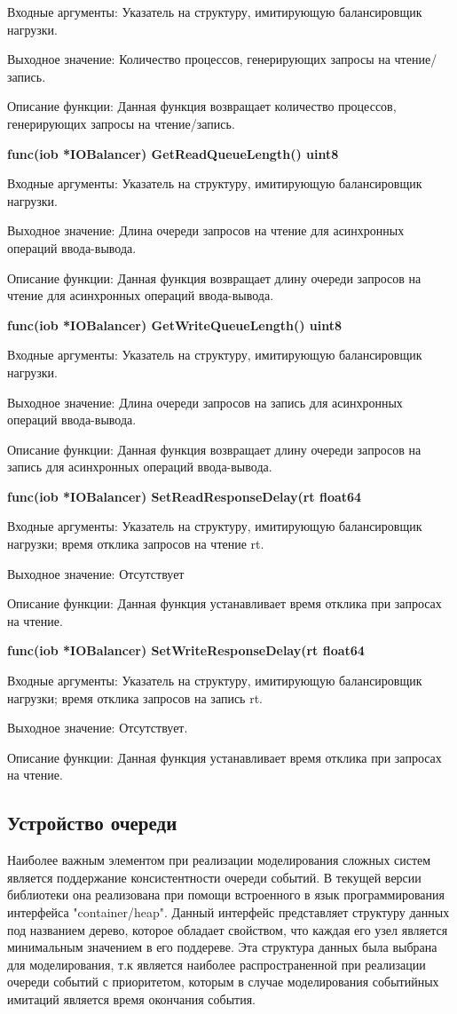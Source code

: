 Входные аргументы: Указатель на структуру, имитирующую балансировщик нагрузки.

Выходное значение: Количество процессов, генерирующих запросы на чтение/запись.

Описание функции: Данная функция возвращает количество процессов, генерирующих запросы на чтение/запись.

\textbf{func(iob *IOBalancer) GetReadQueueLength() uint8}

Входные аргументы: Указатель на структуру, имитирующую балансировщик нагрузки.

Выходное значение: Длина очереди запросов на чтение для асинхронных операций ввода-вывода.

Описание функции: Данная функция возвращает длину очереди запросов на чтение для асинхронных операций ввода-вывода.

\textbf{func(iob *IOBalancer) GetWriteQueueLength() uint8}

Входные аргументы: Указатель на структуру, имитирующую балансировщик нагрузки.

Выходное значение: Длина очереди запросов на запись для асинхронных операций ввода-вывода. 

Описание функции: Данная функция возвращает длину очереди запросов на запись для асинхронных операций ввода-вывода.

\textbf{func(iob *IOBalancer) SetReadResponseDelay(rt float64}

Входные аргументы: Указатель на структуру, имитирующую балансировщик нагрузки; время отклика запросов на чтение rt.

Выходное значение: Отсутствует 

Описание функции: Данная функция устанавливает время отклика при запросах на чтение.

\textbf{func(iob *IOBalancer) SetWriteResponseDelay(rt float64}

Входные аргументы: Указатель на структуру, имитирующую балансировщик нагрузки; время отклика запросов на запись rt.

Выходное значение: Отсутствует.

Описание функции: Данная функция устанавливает время отклика при запросах на чтение.

\subsection{Устройство очереди}

Наиболее важным элементом при реализации моделирования сложных систем является поддержание консистентности очереди событий. В текущей версии библиотеки она реализована при помощи встроенного в язык программирования интерфейса "container/heap". Данный интерфейс представляет структуру данных под названием дерево, которое обладает свойством, что каждая его узел является минимальным значением в его поддереве. Эта структура данных была выбрана для моделирования, т.к является наиболее распространенной при реализации очереди событий с приоритетом, которым в случае моделирования событийных имитаций является время окончания события. 

